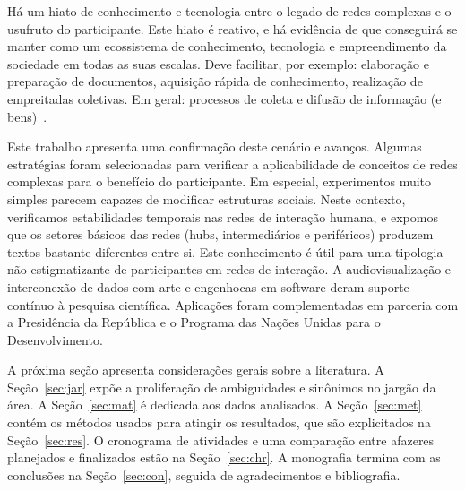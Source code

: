 \documentclass[a4paper,openright,12pt]{report} %
\begin{document}
Há um hiato de conhecimento e tecnologia entre o legado de redes complexas e o usufruto do participante.
Este hiato é reativo, e há evidência de que conseguirá se manter como um ecossistema de conhecimento, tecnologia
e empreendimento da sociedade em todas as suas escalas.
Deve facilitar, por exemplo:
elaboração e preparação de documentos, aquisição rápida de conhecimento,
realização de empreitadas coletivas.
Em geral: processos de coleta e difusão de informação (e bens)~\cite{pentland1,pentland2}.

Este trabalho apresenta uma confirmação deste cenário e avanços.
Algumas estratégias foram selecionadas para verificar a aplicabilidade
de conceitos de redes complexas para o benefício do participante.
Em especial, experimentos muito simples parecem capazes de modificar
estruturas sociais. Neste contexto, verificamos estabilidades temporais
nas redes de interação humana, e expomos que os setores básicos
das redes (hubs, intermediários e periféricos)
produzem textos bastante diferentes entre si.
Este conhecimento é útil para uma tipologia não estigmatizante
de participantes em redes de interação.
A audiovisualização e interconexão de dados com arte e engenhocas
em software deram suporte contínuo à pesquisa científica.
Aplicações foram complementadas em parceria com a Presidência da República
e o Programa das Nações Unidas para o Desenvolvimento.

A próxima seção apresenta considerações gerais sobre a literatura.
A Seção~\ref{sec:jar} expõe a proliferação de ambiguidades e sinônimos
no jargão da área.
A Seção~\ref{sec:mat} é dedicada aos dados analisados.
A Seção~\ref{sec:met} contém os métodos usados para atingir os resultados, que são explicitados na Seção~\ref{sec:res}. O cronograma de atividades e uma comparação entre afazeres planejados e finalizados
estão na Seção~\ref{sec:chr}.
A monografia termina com as conclusões na Seção~\ref{sec:con}, seguida de agradecimentos e bibliografia.
\end{document}
